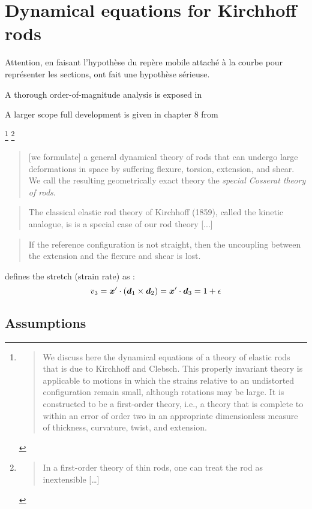 \section{Dynamical equations for Kirchhoff rods}

Attention, en faisant l'hypothèse du repère mobile attaché à la courbe pour représenter les sections, ont fait une hypothèse sérieuse.

A thorough order-of-magnitude analysis is exposed in \cite{Dill1992, Coleman1993}

A larger scope full development is given in chapter 8 from \cite[pp.~270-274]{Antman2005}

\footnote{\blockcquote[p.~1]{Coleman1993}{We discuss here the dynamical equations of a theory of elastic rods that is due to Kirchhoff and Clebsch. This properly invariant theory is applicable to motions in which the strains relative to an undistorted configuration remain small, although rotations may be large. It is constructed to be a first-order theory, i.e., a theory that is complete to within an error of order two in an appropriate dimensionless measure of thickness, curvature, twist, and extension.}}
\footnote{\blockcquote[p.~1]{Coleman1993}{In a first-order theory of thin rods, one can treat the rod as inextensible [\dots]}}

\blockcquote[p.~270]{Antman2005}{[we formulate] a general dynamical theory of rods that can undergo large deformations in space by suffering flexure, torsion, extension, and shear. We call the resulting geometrically exact theory the \emph{special Cosserat theory of rods}.}

\blockcquote[p.~238]{Antman2005}{The classical elastic rod theory of Kirchhoff (1859), called the kinetic analogue, is is a special case of our rod theory [...]}

\blockcquote[p.~341]{Antman2005}{If the reference configuration is not straight, then the uncoupling between the extension and the flexure and shear is lost.}

\cite[pp.~283]{Antman2005} defines the stretch (strain rate) as :
\begin{equation}
	v_3 = \boldsymbol{x}' \cdot (\boldsymbol{d}_1 \times \boldsymbol{d}_2) =  \boldsymbol{x}' \cdot \boldsymbol{d}_3 = 1+\epsilon
\end{equation}

\subsection{Assumptions}

